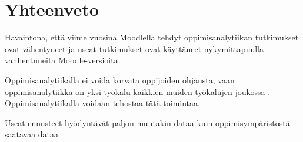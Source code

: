 \chapter{Yhteenveto\label{yhteenveto}}

Havaintona, että viime vuosina Moodlella tehdyt oppimisanalytiikan tutkimukset ovat vähentyneet ja useat tutkimukset ovat käyttäneet nykymittapuulla vanhentuneita Moodle-versioita.

Oppimisanalytiikalla ei voida korvata oppijoiden ohjausta, vaan oppimisanalytiikka on yksi työkalu kaikkien muiden työkalujen joukossa \citep{auvinenOppimisanalytiikkaTuleeOletko2017}. Oppimisanalytiikalla voidaan tehostaa tätä toimintaa.

Useat ennusteet hyödyntävät paljon muutakin dataa kuin oppimisympäristöstä saatavaa dataa